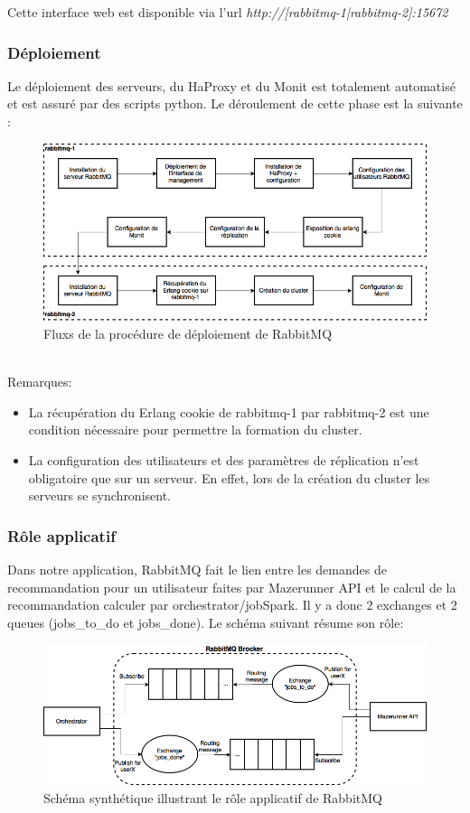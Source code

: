 Cette interface web est disponible via l'url \textit{http://[rabbitmq-1|rabbitmq-2]:15672}

\subsubsection{Déploiement}

Le déploiement des serveurs, du HaProxy et du Monit est totalement automatisé et est assuré par des scripts python. Le déroulement de cette phase est la suivante :
\ \\
\begin{figure}[h]
    \centering
    \includegraphics[scale=0.4]{pics/rabbitmq_deploy.png}
    \caption{Fluxs de la procédure de déploiement de RabbitMQ}
\end{figure}
\ \\
Remarques:
\begin{itemize}
	\item La récupération du Erlang cookie de rabbitmq-1 par rabbitmq-2 est une condition nécessaire pour permettre la formation du cluster.
	\item La configuration des utilisateurs et des paramètres de réplication n'est obligatoire que sur un serveur. En effet, lors de la création du cluster les serveurs se synchronisent.
\end{itemize}

\subsubsection{Rôle applicatif}

Dans notre application, RabbitMQ fait le lien entre les demandes de recommandation pour un utilisateur faites par Mazerunner API et le calcul de la recommandation calculer par orchestrator/jobSpark. Il y a donc 2 exchanges et 2 queues (jobs\_to\_do et jobs\_done). Le schéma suivant résume son rôle:
\ \\
\begin{figure}[h]
    \centering
    \includegraphics[scale=0.4]{pics/rabbitmq_role.png}
    \caption{Schéma synthétique illustrant le rôle applicatif de RabbitMQ}
\end{figure}
\FloatBarrier
